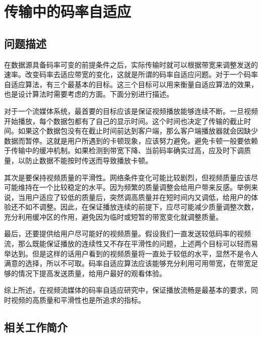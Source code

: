 \section{传输中的码率自适应}

\subsection{问题描述}

在数据源具备码率可变的前提条件之后，实际传输时就可以根据带宽来调整发送的速率。改变码率去适应带宽的变化，这就是所谓的码率自适应问题。对于一个码率自适应算法，有三个最基本的目标。这三个目标可以用来衡量自适应算法的效果，也是设计算法时需要考虑的方面。下面分别进行描述。

对于一个流媒体系统，最首要的目标应该是保证视频播放能够连续不断。一旦视频开始播放，每个数据包都有了自己的显示时间。这个时间也决定了传输的截止时间。如果这个数据包没有在截止时间前达到客户端，那么客户端播放器就会因缺少数据而暂停。这就是用户所遇到的卡顿现象，应该努力避免。避免卡顿一般要依赖于传输中的缓冲机制。如果检测到带宽下降、当前码率确实过高，应及时下调质量，以防止数据不能按时传送而导致播放卡顿。

其次是要保持视频质量的平滑性。网络条件变化可能比较剧烈，但视频质量应该尽可能维持在一个比较稳定的水平。因为频繁的质量调整会给用户带来反感。举例来说，当用户适应了较低的质量后，突然调高质量并在短时间内又调低，给用户的体验还不如不调整。因此，在保证播放连续的前提下，应尽可能减少质量调整次数，充分利用缓冲区的作用，避免因为临时或短暂的带宽变化就调整质量。

最后，还要提供给用户尽可能好的视频质量。假设我们一直发送较低码率的视频流，那么既能保证播放的连续性又不存在平滑性的问题，上述两个目标可以轻而易举达到。但是这样的话用户看到的视频质量将一直处于较低的水平，显然不是令人满意的选择，所以不可取。码率自适应算法应该能够充分利用可用带宽，在带宽足够的情况下提高发送质量，给用户最好的观看体验。

综上所述，在视频流媒体的码率自适应研究中，保证播放流畅是最基本的要求，同时视频的高质量和平滑性也是所追求的指标。

\subsection{相关工作简介}

